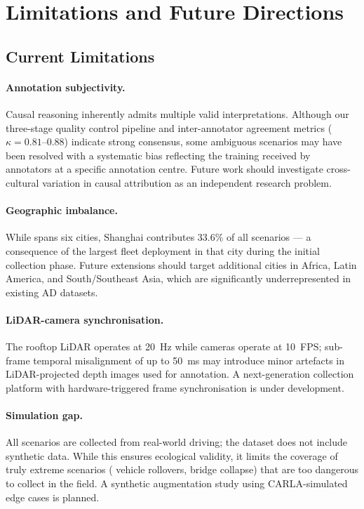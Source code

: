 \section{Limitations and Future Directions}
\label{sec:limitations}

\subsection{Current Limitations}
\label{ssec:limitations_current}

\paragraph{Annotation subjectivity.} Causal reasoning inherently admits multiple
valid interpretations. Although our three-stage quality control pipeline and
inter-annotator agreement metrics ($\kappa = 0.81$--$0.88$) indicate strong consensus,
some ambiguous scenarios may have been resolved with a systematic bias reflecting
the training received by annotators at a specific annotation centre. Future work
should investigate cross-cultural variation in causal attribution as an independent
research problem.

\paragraph{Geographic imbalance.} While \lucid{} spans six cities, Shanghai
contributes 33.6\% of all scenarios --- a consequence of the largest fleet deployment
in that city during the initial collection phase. Future extensions should target
additional cities in Africa, Latin America, and South/Southeast Asia, which are
significantly underrepresented in existing AD datasets.

\paragraph{LiDAR-camera synchronisation.} The rooftop LiDAR operates at 20~Hz while
cameras operate at 10~FPS; sub-frame temporal misalignment of up to 50~ms may
introduce minor artefacts in LiDAR-projected depth images used for annotation.
A next-generation collection platform with hardware-triggered frame synchronisation
is under development.

\paragraph{Simulation gap.} All \lucid{} scenarios are collected from real-world
driving; the dataset does not include synthetic data. While this ensures ecological
validity, it limits the coverage of truly extreme scenarios (\eg{} vehicle rollovers,
bridge collapse) that are too dangerous to collect in the field. A synthetic
augmentation study using CARLA-simulated edge cases is planned.

